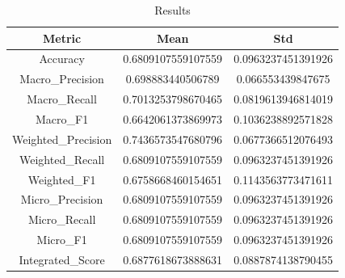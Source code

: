 \begin{table}[htbp]
\centering
\caption{Results}
\label{tab:csv}
\small
\setlength{\tabcolsep}{4pt}
\begin{tabular}{|c|c|c|}
\hline
Metric & Mean & Std \\
\hline
Accuracy & 0.6809107559107559 & 0.0963237451391926 \\
Macro_Precision & 0.698883440506789 & 0.066553439847675 \\
Macro_Recall & 0.7013253798670465 & 0.0819613946814019 \\
Macro_F1 & 0.6642061373869973 & 0.1036238892571828 \\
Weighted_Precision & 0.7436573547680796 & 0.0677366512076493 \\
Weighted_Recall & 0.6809107559107559 & 0.0963237451391926 \\
Weighted_F1 & 0.6758668460154651 & 0.1143563773471611 \\
Micro_Precision & 0.6809107559107559 & 0.0963237451391926 \\
Micro_Recall & 0.6809107559107559 & 0.0963237451391926 \\
Micro_F1 & 0.6809107559107559 & 0.0963237451391926 \\
Integrated_Score & 0.6877618673888631 & 0.0887874138790455 \\
\hline
\end{tabular}
\end{table}